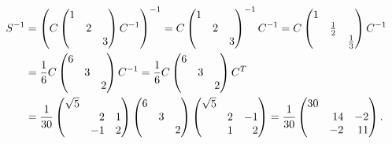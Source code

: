 \begin{align*}
    S^{-1}
  &=  \left(
      C
      \begin{pmatrix}
        1 &   &   \\
          & 2 &   \\
          &   & 3
      \end{pmatrix}
      C^{-1}
      \right)^{-1}
   =  C
      \begin{pmatrix}
        1 &   &   \\
          & 2 &   \\
          &   & 3
      \end{pmatrix}^{-1}
      C^{-1}
   =  C
      \begin{pmatrix}
        1 &             &             \\
          & \frac{1}{2} &             \\
          &             & \frac{1}{3}
      \end{pmatrix}
      C^{-1}
  \\
  &=  \frac{1}{6}
      C
      \begin{pmatrix}
        6 &   &   \\
          & 3 &   \\
          &   & 2
      \end{pmatrix}
      C^{-1}
   =  \frac{1}{6}
      C
      \begin{pmatrix}
        6 &   &   \\
          & 3 &   \\
          &   & 2
      \end{pmatrix}
      \transpose{C}
  \\
  &=  \frac{1}{30}
      \begin{pmatrix*}[r]
        \sqrt{5}  &     &   \\
                  &  2  & 1 \\
                  & -1  & 2
      \end{pmatrix*}
      \begin{pmatrix}
        6 &   &   \\
          & 3 &   \\
          &   & 2
      \end{pmatrix}
      \begin{pmatrix*}[r]
        \sqrt{5}  &   &     \\
                  & 2 & -1  \\
                  & 1 &  2
    \end{pmatrix*}
  = \frac{1}{30}
    \begin{pmatrix*}[r]
      30  &     &     \\
          & 14  & -2  \\
          & -2  & 11
    \end{pmatrix*}.
\end{align*}
